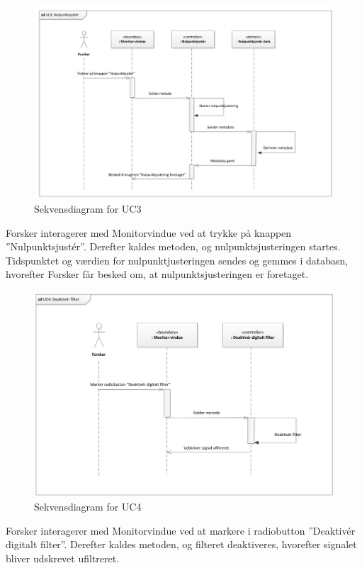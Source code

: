 \begin{figure}[H]
	\centering
	\includegraphics[width=1\textwidth]{Figurer/Snip20151104_33}
	\caption{Sekvensdiagram for UC3}
\end{figure}

Forsker interagerer med Monitorvindue ved at trykke på knappen ”Nulpunktsjustér”. Derefter kaldes metoden, og nulpunktsjusteringen startes. Tidspunktet og værdien for nulpunktjusteringen sendes og gemmes i databasn, hvorefter Forsker får besked om, at nulpunktsjusteringen er foretaget. 

\begin{figure}[H]
	\centering
	\includegraphics[width=1\textwidth]{Figurer/Snip20151104_34}
	\caption{Sekvensdiagram for UC4}
\end{figure}

Forsker interagerer med Monitorvindue ved at markere i radiobutton ”Deaktivér digitalt filter”. Derefter kaldes metoden, og filteret deaktiveres, hvorefter signalet bliver udskrevet ufiltreret.

